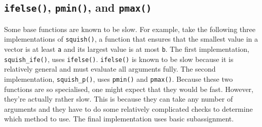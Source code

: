 \hypertarget{ifelse-pmin-and-pmax}{%
\subsection{\texorpdfstring{\texttt{ifelse()}, \texttt{pmin()}, and
\texttt{pmax()}}{ifelse(), pmin(), and pmax()}}\label{ifelse-pmin-and-pmax}}

Some base functions are known to be slow. For example, take the
following three implementations of \texttt{squish()}, a function that
ensures that the smallest value in a vector is at least \texttt{a} and
its largest value is at most \texttt{b}. The first implementation,
\texttt{squish\_ife()}, uses \texttt{ifelse()}. \texttt{ifelse()} is
known to be slow because it is relatively general and must evaluate all
arguments fully. The second implementation, \texttt{squish\_p()}, uses
\texttt{pmin()} and \texttt{pmax()}. Because these two functions are so
specialised, one might expect that they would be fast. However, they're
actually rather slow. This is because they can take any number of
arguments and they have to do some relatively complicated checks to
determine which method to use. The final implementation uses basic
subassignment.   

\begin{Shaded}
\begin{Highlighting}[]
\StringTok{ }
  \OperatorTok{<=}\StringTok{ }\OperatorTok{>=}\StringTok{ }
\NormalTok{\}}
\StringTok{ }
  \NormalTok{(}
\NormalTok{\}}
\StringTok{ }
\NormalTok{  x[x }\OperatorTok{<=}\StringTok{ }\NormalTok{a] <-}\StringTok{ }
\NormalTok{  x[x }\OperatorTok{>=}\StringTok{ }\NormalTok{b] <-}\StringTok{ }
\NormalTok{\}}

\StringTok{ }\NormalTok{(}\NormalTok{, }\NormalTok{, }\NormalTok{)}
\NormalTok{(}
   \NormalTok{, }\NormalTok{),}
   \NormalTok{, }\NormalTok{),}
   \NormalTok{, }\NormalTok{),}
   
\NormalTok{)}
\end{Highlighting}
\end{Shaded}


